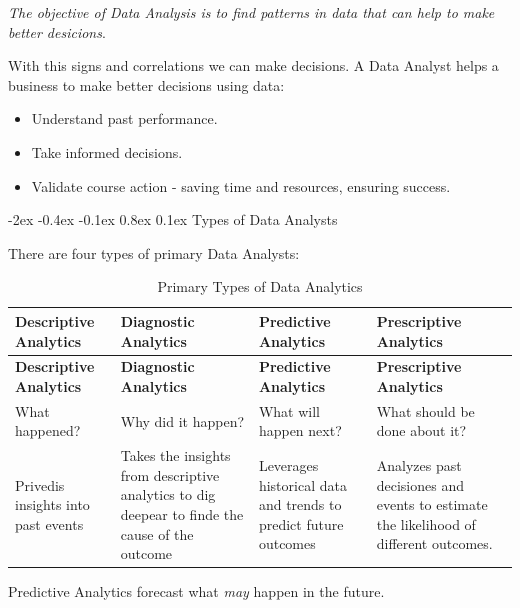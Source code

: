 \documentclass[12pt]{report}
\makeatletter
\renewcommand{\subsection}{\@startsection{subsection}{2}{\z@}%
  {-2ex \@plus -0.4ex \@minus -0.1ex}%
  {0.8ex \@plus 0.1ex}%
  {\normalfont\large\subsectionstyle}}
\newcommand{\subsectionstyle}[1]{%
  \par\noindent\hrule
  \vspace{-0.4ex}%
  {\scshape #1\par}%
  \vspace{0.4ex}%
  \hrule
}
\theoremstyle{largebreak}
\makeatother
\begin{document}
    \begin{center}
        \textit{The objective of Data Analysis is to find patterns in data that can help to make better desicions}.
    \end{center}

    With this signs and correlations we can make decisions. A Data Analyst helps a business to make better decisions using data:
    \begin{itemize}
        \item Understand past performance.
        \item Take informed decisions.
        \item Validate course action - saving time and resources, ensuring success.
    \end{itemize}

    \subsection{Types of Data Analysts}

    There are four types of primary Data Analysts:

    \begin{longtable}{p{4cm} p{4cm} p{4cm} p{4cm}}
    \toprule
    \textbf{ Descriptive Analytics } & \textbf{ Diagnostic Analytics } & \textbf{ Predictive Analytics } & \textbf{ Prescriptive Analytics } \\
    \midrule
    \endfirsthead
    
    \toprule
    \textbf{ Descriptive Analytics } & \textbf{ Diagnostic Analytics } & \textbf{ Predictive Analytics } & \textbf{ Prescriptive Analytics } \\
    \endhead
    
    \bottomrule
    \caption{ Primary Types of Data Analytics }
    \label{table:primary_data_analysts}
    \endlastfoot
    
    
     What happened? & Why did it happen? & What will happen next? & What should be done about it? \\ 
    \hline 
     Privedis insights into past events & Takes the insights from descriptive analytics to dig deepear to finde the cause of the outcome & Leverages historical data and trends to predict future outcomes & Analyzes past decisiones and events to estimate the likelihood of different outcomes. \\ 
    \end{longtable}

    \begin{obs}
        Predictive Analytics forecast what \textit{may} happen in the future.
    \end{obs}
\end{document}
